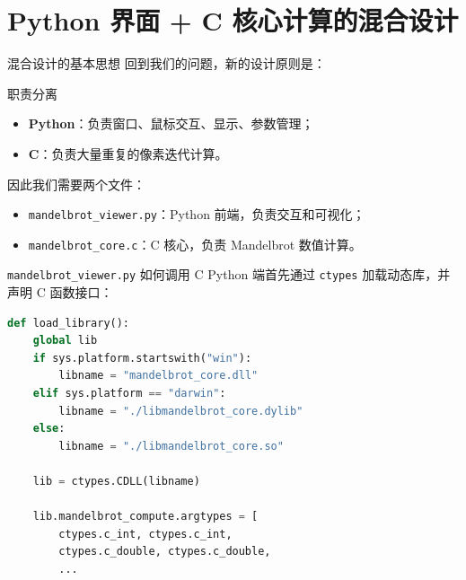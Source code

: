 \documentclass[aspectratio=169,11pt]{ctexbeamer}
\begin{document}
\section{ Python 界面 + C 核心计算的混合设计}

\begin{frame}{混合设计的基本思想}
回到我们的问题，新的设计原则是：

\begin{block}{职责分离}
\begin{itemize}
  \item \textbf{Python}：负责窗口、鼠标交互、显示、参数管理；
  \item \textbf{C}：负责大量重复的像素迭代计算。
\end{itemize}
\end{block}

\vspace{0.5em}
因此我们需要两个文件：

\begin{itemize}
  \item \texttt{mandelbrot\_viewer.py}：Python 前端，负责交互和可视化；
  \item \texttt{mandelbrot\_core.c}：C 核心，负责 Mandelbrot 数值计算。
\end{itemize}
\end{frame}

\begin{frame}[fragile]{\texttt{mandelbrot\_viewer.py} 如何调用 C}
Python 端首先通过 \texttt{ctypes} 加载动态库，并声明 C 函数接口：

\begin{lstlisting}[language=Python]
def load_library():
    global lib
    if sys.platform.startswith("win"):
        libname = "mandelbrot_core.dll"
    elif sys.platform == "darwin":
        libname = "./libmandelbrot_core.dylib"
    else:
        libname = "./libmandelbrot_core.so"

    lib = ctypes.CDLL(libname)

    lib.mandelbrot_compute.argtypes = [
        ctypes.c_int, ctypes.c_int,
        ctypes.c_double, ctypes.c_double,
        ...
\end{lstlisting}

\end{frame}
\end{document}
